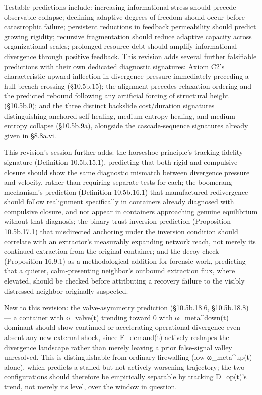 \documentclass[
]{article}
\begin{document}
Testable predictions include: increasing informational stress should
precede observable collapse; declining adaptive degrees of freedom
should occur before catastrophic failure; persistent reductions in
feedback permeability should predict growing rigidity; recursive
fragmentation should reduce adaptive capacity across organizational
scales; prolonged resource debt should amplify informational divergence
through positive feedback. This revision adds several further
falsifiable predictions with their own dedicated diagnostic signatures:
Axiom C2's characteristic upward inflection in divergence pressure
immediately preceding a hull-breach crossing (§10.5b.15); the
alignment-precedes-relaxation ordering and the predicted rebound
following any artificial forcing of structural height (§10.5b.0); and
the three distinct backslide cost/duration signatures distinguishing
anchored self-healing, medium-entropy healing, and medium-entropy
collapse (§10.5b.9a), alongside the cascade-sequence signatures already
given in §8.8a.vi.

This revision's session further adds: the horseshoe principle's
tracking-fidelity signature (Definition 10.5b.15.1), predicting that
both rigid and compulsive closure should show the same diagnostic
mismatch between divergence pressure and velocity, rather than requiring
separate tests for each; the boomerang mechanism's prediction
(Definition 10.5b.16.1) that manufactured redivergence should follow
realignment specifically in containers already diagnosed with compulsive
closure, and not appear in containers approaching genuine equilibrium
without that diagnosis; the binary-trust-inversion prediction
(Proposition 10.5b.17.1) that misdirected anchoring under the inversion
condition should correlate with an extractor's measurably expanding
network reach, not merely its continued extraction from the original
container; and the decoy check (Proposition 16.9.1) as a methodological
addition for forensic work, predicting that a quieter, calm-presenting
neighbor's outbound extraction flux, where elevated, should be checked
before attributing a recovery failure to the visibly distressed neighbor
originally suspected.

New to this revision: the valve-asymmetry prediction (§10.5b.18.6,
§10.5b.18.8) --- a container with σ\_valve(t) trending toward 0 with
ω\_meta\^{}down(t) dominant should show continued or accelerating
operational divergence even absent any new external shock, since
F\_demand(t) actively reshapes the divergence landscape rather than
merely leaving a prior false-signal valley unresolved. This is
distinguishable from ordinary firewalling (low ω\_meta\^{}up(t) alone),
which predicts a stalled but not actively worsening trajectory; the two
configurations should therefore be empirically separable by tracking
D\_op(t)'s trend, not merely its level, over the window in question.
\end{document}
